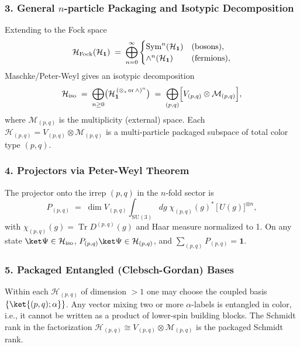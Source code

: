 \documentclass[12pt,a4paper]{article}
\begin{document}
\subsubsection*{3. General $n$-particle Packaging and Isotypic Decomposition}

Extending to the Fock space
\[
\mathcal H_{\rm Fock}(\mathcal H_{\mathbf{1}})
\;=\;
\bigoplus_{n=0}^\infty
\begin{cases}
	\operatorname{Sym}^n(\mathcal H_{\mathbf{1}}) & (\text{bosons}),\\
	\wedge^n(\mathcal H_{\mathbf{1}}) & (\text{fermions}),
\end{cases}
\]
Maschke/Peter-Weyl gives an isotypic decomposition
\[
\mathcal H_{\rm iso}
\;=\;
\bigoplus_{n\ge0}\bigl(\mathcal H_{\mathbf{1}}^{\,(\otimes_s\,\text{or}\,\wedge)^n}\bigr)
\;=\;
\bigoplus_{(p,q)}
\Bigl[V_{(p,q)} \otimes \mathcal M_{(p,q)}\Bigr],
\]
where $\mathcal M_{(p,q)}$ is the multiplicity (external) space.
Each $\mathcal H_{(p,q)} = V_{(p,q)} \otimes \mathcal M_{(p,q)}$ is a multi-particle packaged subspace of total color type $(p,q)$.



\subsubsection*{4. Projectors via Peter-Weyl Theorem}

The projector onto the irrep $(p,q)$ in the $n$-fold sector is
\[
P_{(p,q)}
\;=\;
\dim V_{(p,q)}
\int_{\mathrm{SU}(3)}dg\;\chi_{(p,q)}(g)^*\,
\bigl[\,U(g)\bigr]^{\otimes n},
\]
with $\chi_{(p,q)}(g)=\operatorname{Tr} D^{(p,q)}(g)$ and Haar measure normalized to 1.
On any state
$\ket\Psi \in \mathcal H_{\rm iso}$,
$P_{(p,q)}\ket\Psi\in \mathcal H_{(p,q)}$, and 
$\sum_{(p,q)} P_{(p,q)} = \mathbf{1}$.



\subsubsection*{5. Packaged Entangled (Clebsch-Gordan) Bases}

Within each $\mathcal H_{(p,q)}$ of dimension $>1$ one may choose the coupled basis
$\{\ket{(p,q);\alpha}\}$.
Any vector mixing two or more $\alpha$-labels is entangled in color, i.e., it cannot be written as a product of lower-spin building blocks.
The Schmidt rank in the factorization $\mathcal H_{(p,q)} \cong V_{(p,q)} \otimes \mathcal M_{(p,q)}$ is the packaged Schmidt rank.
\end{document}

